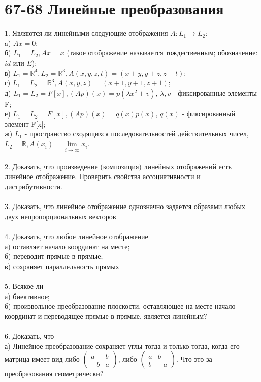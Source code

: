 \documentclass[12pt]{article}
\begin{document}
\section*{67-68 Линейные преобразования}
1. Являются ли линейными следующие отображения $A: L_1 \to L_2$:\\
a) $Ax = 0$;\\
б) $L_1 = L_2, Ax = x$ (такое отображение называется тождественным; обозначение: $id$ или $E$);\\
в) $L_1 = \mathbb{R}^4, L_2 = \mathbb{R}^3, A(x,y,z,t) = (x+y, y+z, z+t)$;\\
г) $L_1 = L_2 = \mathbb{R}^3, A(x,y,z) = (x+1, y+1, z+1)$;\\
д) $L_1 = L_2 = F[x], (Ap)(x) = p(\lambda x^2 + v)$, $\lambda , v$ - фиксированные элементы F;\\
е) $L_1 = L_2 = F[x], (Ap)(x) = q(x)p(x)$, $q(x)$ - фиксированный элемент F[x];\\
ж) $L_1$ - пространство сходящихся последовательностей действительных чисел, $L_2 = \mathbb{R}, A(x_i) = \lim\limits_{i \to \infty}{x_i}$.\\
\\
2. Доказать, что произведение (композиция) линейных отображений есть линейное отображение. Проверить свойства ассоциативности и дистрибутивности.\\
\\
3. Доказать, что линейное отображение однозначно задается образами любых двух непропорциональных векторов\\
\\
4. Доказать, что любое линейное отображение\\
а) оставляет начало координат на месте;\\
б) переводит прямые в прямые;\\
в) сохраняет параллельность прямых\\
\\
5. Всякое ли\\
а) биективное;\\
б) произвольное преобразование плоскости, оставляющее на месте начало координат и переводящее прямые в прямые, является линейным?\\
\\
6. Доказать, что\\ 
а) Линейное преобразование сохраняет углы тогда и только тогда, когда
его матрица имеет вид либо $\begin{pmatrix}a & b\\ -b & a\end{pmatrix}$, либо $\begin{pmatrix}a & b\\ b & -a\end{pmatrix}$. Что это за преобразования геометрически?\\
\end{document}
